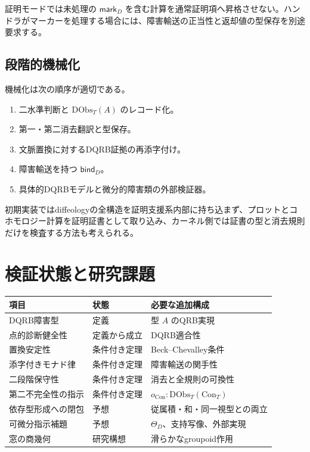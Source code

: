\documentclass[a4paper,11pt]{ltjsarticle}
\theoremstyle{definition}
\theoremstyle{plain}
\newcommand{\DObs}{\mathrm{DObs}}
\newcommand{\Con}{\mathrm{Con}}
\begin{document}
証明モードでは未処理の $\mathsf{mark}_D$ を含む計算を通常証明項へ昇格させない。ハンドラがマーカーを処理する場合には、障害輸送の正当性と返却値の型保存を別途要求する。

\subsection{段階的機械化}

機械化は次の順序が適切である。
\begin{enumerate}
 \item 二水準判断と $\DObs_T(A)$ のレコード化。
 \item 第一・第二消去翻訳と型保存。
 \item 文脈置換に対するDQRB証拠の再添字付け。
 \item 障害輸送を持つ $\mathsf{bind}_D$。
 \item 具体的DQRBモデルと微分的障害類の外部検証器。
\end{enumerate}

初期実装ではdiffeologyの全構造を証明支援系内部に持ち込まず、プロットとコホモロジー計算を証明証書として取り込み、カーネル側では証書の型と消去規則だけを検査する方法も考えられる。

\section{検証状態と研究課題}

\begin{center}
\begin{tabular}{p{} p{} p{}}
\toprule
項目 & 状態 & 必要な追加構成 \\
\midrule
DQRB障害型 & 定義 & 型 $A$ のQRB実現 \\
点的診断健全性 & 定義から成立 & DQRB適合性 \\
置換安定性 & 条件付き定理 & Beck--Chevalley条件 \\
添字付きモナド律 & 条件付き定理 & 障害輸送の関手性 \\
二段階保守性 & 条件付き定理 & 消去と全規則の可換性 \\
第二不完全性の指示 & 条件付き定理 & $o_{\Con}:\DObs_T(\Con_T)$ \\
依存型形成への閉包 & 予想 & 従属積・和・同一視型との両立 \\
可微分指示補題 & 予想 & $\Theta_D$、支持写像、外部実現 \\
窓の商幾何 & 研究構想 & 滑らかなgroupoid作用 \\
\bottomrule
\end{tabular}
\end{center}
\end{document}
